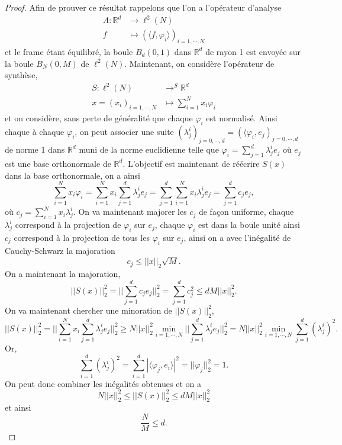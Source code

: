 \begin{proof}
	Afin de prouver ce résultat rappelons que l'on a l'opérateur d'analyse
	\begin{align}
		A :	\mathbb{R}^d &\longrightarrow \ell^2(N)\\
			f &\longmapsto (\langle f, \varphi_i \rangle)_{i=1,\cdots, N}
	\end{align}
	et le frame étant équilibré, la boule $B_d(0,1)$ dans $\mathbb{R}^d$ de rayon 1 est envoyée sur la boule $B_N(0,M)$ de $\ell^2(N)$.
	Maintenant, on considère l'opérateur de synthèse,
	\begin{align}
		S :	\ell^2(N) &\longrightarrow^S \mathbb{R}^d\\
			x=(x_i)_{i=1, \cdots, N} &\longmapsto \sum_{i=1}^N x_i \varphi_i
	\end{align}
	et on considère, sans perte de généralité que chaque $\varphi_i$ est normalisé. Ainsi chaque à chaque $\varphi_i$, on peut associer une suite $(\lambda_j^i)_{j=0, \cdots, d}=(\langle \varphi_i, e_j)_{j=0,\cdots, d}$ de norme 1 dans $\mathbb{R}^d$ muni de la norme euclidienne telle que $\varphi_i = \sum_{j=1}^d \lambda_j^i e_j$ où $e_j$ est une base orthonormale de $\mathbb{R}^d$. 
	L'objectif est maintenant de réécrire $S(x)$ dans la base orthonormale, on a ainsi
	\begin{equation}
		\sum_{i=1}^N x_i \varphi_i = \sum_{i=1}^N x_i \sum_{j=1}^d \lambda_j^i e_j = \sum_{j=1}^d \sum_{i=1}^N x_i \lambda_j^ie_j =\sum_{j=1}^d c_j e_j,
	\end{equation}
	où $c_j = \sum_{i=1}^Nx_i\lambda_j^i$. On va maintenant majorer les $c_j$ de façon uniforme, chaque $\lambda_j^i$ correspond à la projection de $\varphi_i$ sur $e_j$, chaque $\varphi_i$ est dans la boule unité ainsi $c_j$ correspond à la projection de tous les $\varphi_i$ sur $e_j$, ainsi on a avec l'inégalité de Cauchy-Schwarz la majoration
	\begin{equation}
		c_j \leq ||x||_2 \sqrt{M}.
	\end{equation}
	On a maintenant la majoration,
	\begin{equation}
		||S (x)||^2_2 = ||\sum_{j=1}^d c_j e_j||_2^2= \sum_{j=1}^d c_j^2 \leq d M||x||_2^2. 
	\end{equation}
	On va maintenant chercher une minoration de $||S(x)||_2^2$,
	\begin{equation}
		||S(x)||_2^2 = ||\sum_{i=1}^N x_i \sum_{j=1}^d \lambda_j^i e_j||_2^2 \geq N||x||_2^2 \min_{i=1, \cdots, N} ||\sum_{j=1}^d \lambda_j^i e_j||_2^2 = N||x||_2^2 \min_{i=1, \cdots, N}\sum_{j=1}^d (\lambda_j^i)^2.
	\end{equation}
	Or,
	\begin{equation}
		\sum_{i=1}^d (\lambda_j^i)^2 = \sum_{i=1}^d |\langle \varphi_j, e_i \rangle|^2 =||\varphi_j||_2^2=1.  
	\end{equation}
	On peut donc combiner les inégalités obtenues et on a
	\begin{equation}
		N ||x||_2^2 \leq ||S(x)||_2^2 \leq d M||x||_2^2
	\end{equation}
	et ainsi
	\begin{equation}
		\frac{N}{M} \leq d.
	\end{equation}
\end{proof}
